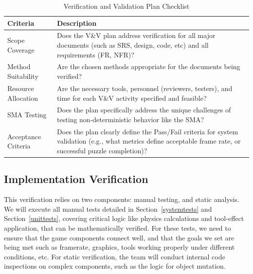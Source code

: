 \documentclass[12pt, titlepage]{article}
\begin{document}
\begin{table}[H]
\caption{Verification and Validation Plan Checklist}
\begin{tabular}{|p{4cm}|p{11cm}|}
\hline
\textbf{Criteria} & \textbf{Description}                                                                                                                                                                \\ \hline
Scope Coverage      & Does the V\&V plan address verification for all major documents (such as SRS, design, code, etc) and all requirements (FR, NFR)?
 \\ \hline
Method Suitability       & Are the chosen methods appropriate for the documents being verified?
\\ \hline
Resource Allocation &Are the necessary tools, personnel (reviewers, testers), and time for each V\&V activity specified and feasible?
\\ \hline
SMA Testing       & Does the plan specifically address the unique challenges of testing non-deterministic behavior like the SMA?
\\ \hline
Acceptance Criteria     & Does the plan clearly define the Pass/Fail criteria for system validation (e.g., what metrics define acceptable frame rate, or successful puzzle completion)? 
\\ \hline
\end{tabular}
\end{table}

\subsection{Implementation Verification}

This verification relies on two components: manual testing, and
static analysis. We will execute all manual tests detailed in Section~\ref{systemtests}
and Section~\ref{unittests}, covering critical logic like physics calculations and
tool-effect application, that can be mathematically verified. For these tests, we need
to ensure that the game components connect well, and that the goals we set are being met
such as framerate, graphics, tools working properly under different conditions, etc.
For static verification, the team will conduct internal code
inspections on complex components, such as the logic for object mutation. 

\end{document}
